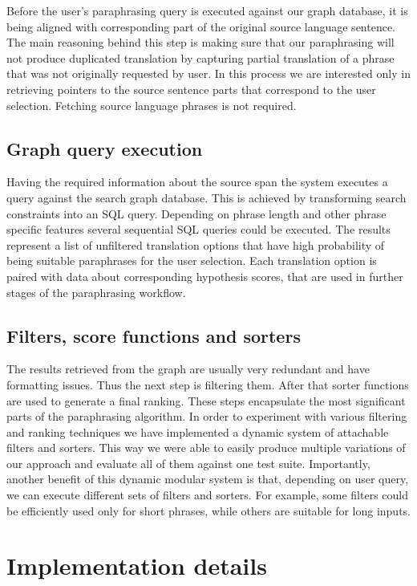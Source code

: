 Before  the user's paraphrasing query is executed against our graph database, it is being aligned with corresponding part of the original source language sentence. The main reasoning behind this step is making sure that our paraphrasing will not produce duplicated translation by capturing partial translation of a phrase that was not originally requested by user. In this process we are interested only in retrieving pointers to the source sentence parts that correspond to the user selection. Fetching source language phrases is not required.

\subsection{Graph query execution}

Having the required information about the source span the system executes a query against the search graph database. This is achieved by transforming search constraints into an SQL query. Depending on phrase length and other phrase specific features several sequential SQL queries could be executed. The results represent a list of unfiltered translation options that have high probability of being suitable paraphrases for the user selection. Each translation option is paired with data about corresponding hypothesis scores, that are used in further stages of the paraphrasing workflow.

\subsection{Filters, score functions and sorters}

The results retrieved from the graph are usually very redundant and have formatting issues. Thus the next step is filtering them. After that sorter functions are used to generate a final ranking. These steps encapsulate the most significant parts of the paraphrasing algorithm. In order to experiment with various filtering and ranking techniques we have implemented a dynamic system of attachable filters and sorters. This way we were able to easily produce multiple variations of our approach and evaluate all of them against one test suite. Importantly, another benefit of this dynamic modular system is that, depending on user query, we can execute different sets of filters and sorters. For example, some filters could be efficiently used only for short phrases, while others are suitable for long inputs. 

\section{Implementation details}

